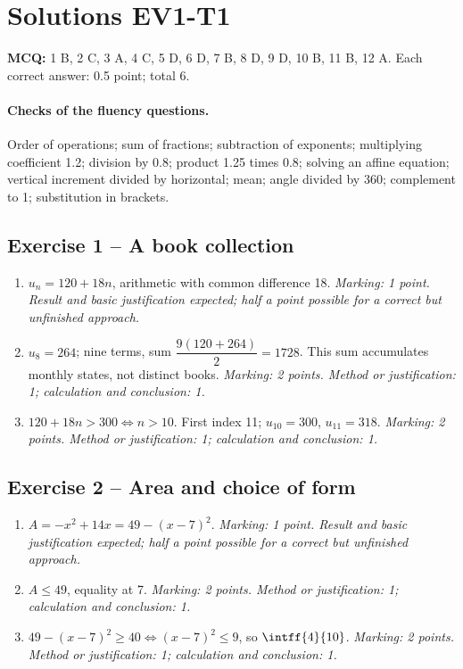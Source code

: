 \mxnewpage\section*{Solutions EV1-T1}\label{EV1-T1-CORR}
\textbf{MCQ:} 1 B, 2 C, 3 A, 4 C, 5 D, 6 D, 7 B, 8 D, 9 D, 10 B, 11 B, 12 A. Each correct answer: \num{0,5} point; total 6.
\paragraph{Checks of the fluency questions.} Order of operations; sum of fractions; subtraction of exponents; multiplying coefficient \num{1,2}; division by \num{0,8}; product \num{1,25} times \num{0,8}; solving an affine equation; vertical increment divided by horizontal; mean; angle divided by 360; complement to 1; substitution in brackets.
\subsection*{Exercise 1 -- A book collection}
\begin{enumerate}
\item $u_n=120+18n$, arithmetic with common difference 18. \textit{Marking: 1 point. Result and basic justification expected; half a point possible for a correct but unfinished approach.}
\item $u_8=264$; nine terms, sum $\dfrac{9(120+264)}{2}=1728$. This sum accumulates monthly states, not distinct books. \textit{Marking: 2 points. Method or justification: 1; calculation and conclusion: 1.}
\item $120+18n>300\iff n>10$. First index 11; $u_{10}=300$, $u_{11}=318$. \textit{Marking: 2 points. Method or justification: 1; calculation and conclusion: 1.}
\end{enumerate}
\subsection*{Exercise 2 -- Area and choice of form}
\begin{enumerate}
\item $A=-x^2+14x=49-(x-7)^2$. \textit{Marking: 1 point. Result and basic justification expected; half a point possible for a correct but unfinished approach.}
\item $A\leq49$, equality at 7. \textit{Marking: 2 points. Method or justification: 1; calculation and conclusion: 1.}
\item $49-(x-7)^2\geq40\iff(x-7)^2\leq9$, so $\intff{4}{10}$. \textit{Marking: 2 points. Method or justification: 1; calculation and conclusion: 1.}
\end{enumerate}
